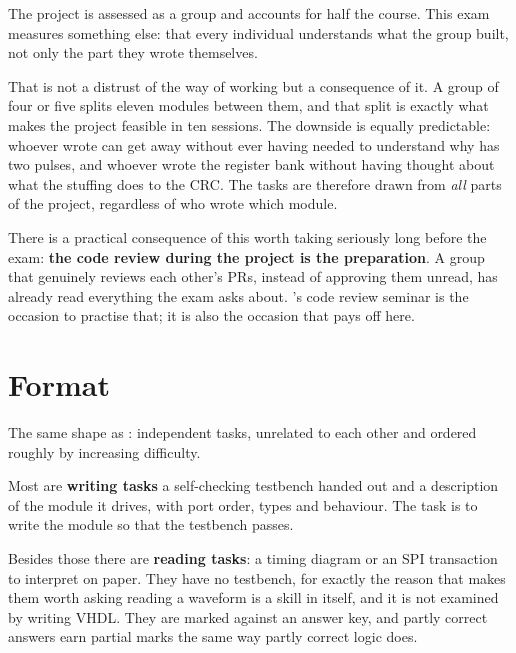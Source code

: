 The project is assessed as a group and accounts for half the course. This exam measures something
else: that every individual understands what the group built, not only the part they wrote
themselves.

That is not a distrust of the way of working but a consequence of it. A group of four or five splits
eleven modules between them, and that split is exactly what makes the project feasible in ten
sessions. The downside is equally predictable: whoever wrote  can get away without ever
having needed to understand why  has two pulses, and whoever wrote the register bank
without having thought about what the stuffing does to the CRC. The tasks are therefore drawn from
\emph{all} parts of the project, regardless of who wrote which module.

\begin{aside}
There is a practical consequence of this worth taking seriously long before the exam: \textbf{the code
review during the project is the preparation}. A group that genuinely reviews each other's PRs,
instead of approving them unread, has already read everything the exam asks about.
's code review seminar is the occasion to practise that; it is also the occasion that
pays off here.
\end{aside}

\section{Format}
\label{c20:sec:format}

The same shape as : independent tasks, unrelated to each other and ordered roughly by
increasing difficulty.

Most are \textbf{writing tasks} \textemdash{} a self-checking testbench handed out and a description
of the module it drives, with port order, types and behaviour. The task is to write the module so that
the testbench passes.

Besides those there are \textbf{reading tasks}: a timing diagram or an SPI transaction to interpret on
paper. They have no testbench, for exactly the reason that makes them worth asking \textemdash{}
reading a waveform is a skill in itself, and it is not examined by writing VHDL. They are marked
against an answer key, and partly correct answers earn partial marks the same way partly correct logic
does.

